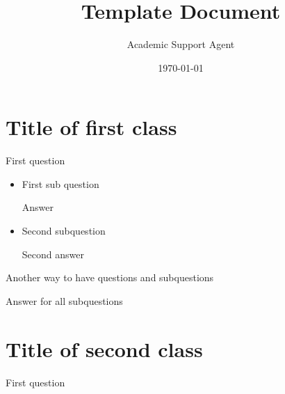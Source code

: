 \documentclass{article}
\title{Template Document}
\author{Academic Support Agent}
\date{\today}
\begin{document}
\maketitle

\section{Title of first class}
\begin{questions}
	\question First question
	
		\begin{itemize}
			\item First sub question
				\begin{solution}
					Answer
				\end{solution}
			\item Second subquestion
				\begin{solution}
    				Second answer
				\end{solution}
		\end{itemize}
	\question Another way to have questions and subquestions
		\begin{solution}
    		Answer for all subquestions
		\end{solution}
\end{questions}

\newpage
\section{Title of second class}
\begin{questions}
	\question First question
\end{questions}
\end{document}
